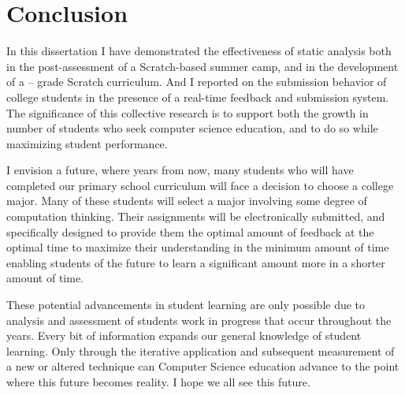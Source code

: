 \chapter{Conclusion} \label{chap:conclusion}

In this dissertation I have demonstrated the effectiveness of static analysis
both in the post-assessment of a Scratch-based summer camp, and in the
development of a  --  grade Scratch curriculum. And I reported on
the submission behavior of college students in the presence of a real-time
feedback and submission system. The significance of this collective research is
to support both the growth in number of students who seek computer science
education, and to do so while maximizing student performance.

I envision a future, where years from now, many students who will have
completed our primary school curriculum will face a decision to choose a
college major. Many of these students will select a major involving some degree
of computation thinking. Their assignments will be electronically submitted,
and specifically designed to provide them the optimal amount of feedback at the
optimal time to maximize their understanding in the minimum amount of time
enabling students of the future to learn a significant amount more in a shorter
amount of time.

These potential advancements in student learning are only possible due to
analysis and assessment of students work in progress that occur throughout the
years. Every bit of information expands our general knowledge of student
learning. Only through the iterative application and subsequent measurement of
a new or altered technique can Computer Science education advance to the point
where this future becomes reality. I hope we all see this future.
